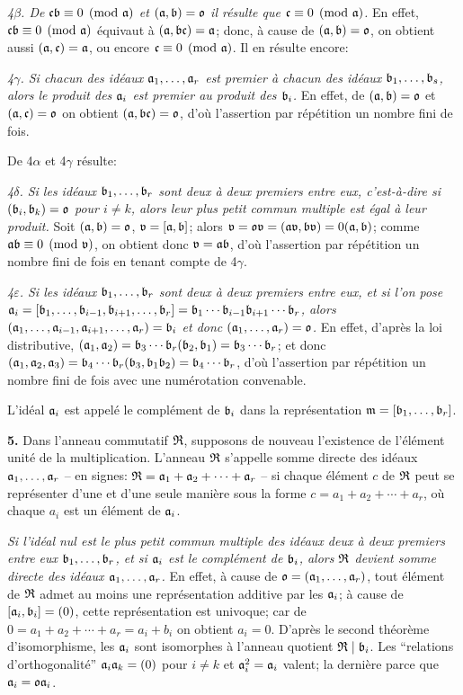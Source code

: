\emph{4$\beta$. De $\mathfrak{c}\mathfrak{b}\equiv0\pmod{\mathfrak{a}}$ et $(\mathfrak{a},\mathfrak{b})=\mathfrak{o}$ il résulte que $\mathfrak{c}\equiv0\pmod{\mathfrak{a}}$.} En effet, $\mathfrak{c}\mathfrak{b}\equiv0\pmod{\mathfrak{a}}$ équivaut à $(\mathfrak{a},\mathfrak{b}\mathfrak{c})=\mathfrak{a}$; donc, à cause de $(\mathfrak{a},\mathfrak{b})=\mathfrak{o}$, on obtient aussi $(\mathfrak{a},\mathfrak{c})=\mathfrak{a}$, ou encore $\mathfrak{c}\equiv0\pmod{\mathfrak{a}}$. Il en résulte encore:

\emph{4$\gamma$. Si chacun des idéaux $\mathfrak{a}_1,\ldots,\mathfrak{a}_r$ est premier à chacun des idéaux $\mathfrak{b}_1,\ldots,\mathfrak{b}_s$, alors le produit des $\mathfrak{a}_i$ est premier au produit des $\mathfrak{b}_i$.} En effet, de $(\mathfrak{a},\mathfrak{b})=\mathfrak{o}$ et $(\mathfrak{a},\mathfrak{c})=\mathfrak{o}$ on obtient $(\mathfrak{a},\mathfrak{b}\mathfrak{c})=\mathfrak{o}$, d'où l'assertion par répétition un nombre fini de fois.

De 4$\alpha$ et 4$\gamma$ résulte:

\emph{4$\delta$. Si les idéaux $\mathfrak{b}_1,\ldots,\mathfrak{b}_r$ sont deux à deux premiers entre eux, c'est-à-dire si $(\mathfrak{b}_i,\mathfrak{b}_k)=\mathfrak{o}$ pour $i\ne k$, alors leur plus petit commun multiple est égal à leur produit.} Soit $(\mathfrak{a},\mathfrak{b})=\mathfrak{o}$, $\mathfrak{v}=[\mathfrak{a},\mathfrak{b}]$; alors $\mathfrak{v}=\mathfrak{o}\mathfrak{v}=(\mathfrak{a}\mathfrak{v},\mathfrak{b}\mathfrak{v})=0(\mathfrak{a},\mathfrak{b})$; comme $\mathfrak{a}\mathfrak{b}\equiv0\pmod{\mathfrak{v}}$, on obtient donc $\mathfrak{v}=\mathfrak{a}\mathfrak{b}$, d'où l'assertion par répétition un nombre fini de fois en tenant compte de 4$\gamma$.

\emph{4$\varepsilon$. Si les idéaux $\mathfrak{b}_1,\ldots,\mathfrak{b}_r$ sont deux à deux premiers entre eux, et si l'on pose $\mathfrak{a}_i=[\mathfrak{b}_1,\ldots,\mathfrak{b}_{i-1},\mathfrak{b}_{i+1},\ldots,\mathfrak{b}_r]=\mathfrak{b}_1\cdots\mathfrak{b}_{i-1}\mathfrak{b}_{i+1}\cdots\mathfrak{b}_r$, alors $(\mathfrak{a}_1,\ldots,\mathfrak{a}_{i-1},\mathfrak{a}_{i+1},\ldots,\mathfrak{a}_r)=\mathfrak{b}_i$ et donc $(\mathfrak{a}_1,\ldots,\mathfrak{a}_r)=\mathfrak{o}$.} En effet, d'après la loi distributive, $(\mathfrak{a}_1,\mathfrak{a}_2)=\mathfrak{b}_3\cdots\mathfrak{b}_r(\mathfrak{b}_2,\mathfrak{b}_1)=\mathfrak{b}_3\cdots\mathfrak{b}_r$; et donc $(\mathfrak{a}_1,\mathfrak{a}_2,\mathfrak{a}_3)=\mathfrak{b}_4\cdots\mathfrak{b}_r(\mathfrak{b}_3,\mathfrak{b}_1\mathfrak{b}_2)=\mathfrak{b}_4\cdots\mathfrak{b}_r$, d'où l'assertion par répétition un nombre fini de fois avec une numérotation convenable.

L'idéal $\mathfrak{a}_i$ est appelé le complément de $\mathfrak{b}_i$ dans la représentation $\mathfrak{m}=[\mathfrak{b}_1,\ldots,\mathfrak{b}_r]$.

\textbf{5.} Dans l'anneau commutatif $\mathfrak{R}$, supposons de nouveau l'existence de l'élément unité de la multiplication. L'anneau $\mathfrak{R}$ s'appelle somme directe des idéaux $\mathfrak{a}_1,\ldots,\mathfrak{a}_r$ -- en signes: $\mathfrak{R}=\mathfrak{a}_1+\mathfrak{a}_2+\cdots+\mathfrak{a}_r$ -- si chaque élément $c$ de $\mathfrak{R}$ peut se représenter d'une et d'une seule manière sous la forme $c=a_1+a_2+\cdots+a_r$, où chaque $a_i$ est un élément de $\mathfrak{a}_i$.

\emph{Si l'idéal nul est le plus petit commun multiple des idéaux deux à deux premiers entre eux $\mathfrak{b}_1,\ldots,\mathfrak{b}_r$, et si $\mathfrak{a}_i$ est le complément de $\mathfrak{b}_i$, alors $\mathfrak{R}$ devient somme directe des idéaux $\mathfrak{a}_1,\ldots,\mathfrak{a}_r$.} En effet, à cause de $\mathfrak{o}=(\mathfrak{a}_1,\ldots,\mathfrak{a}_r)$, tout élément de $\mathfrak{R}$ admet au moins une représentation additive par les $\mathfrak{a}_i$; à cause de $[\mathfrak{a}_i,\mathfrak{b}_i]=(0)$, cette représentation est univoque; car de $0=a_1+a_2+\cdots+a_r=a_i+b_i$ on obtient $a_i=0$. D'après le second théorème d'isomorphisme, les $\mathfrak{a}_i$ sont isomorphes à l'anneau quotient $\mathfrak{R}\mid\mathfrak{b}_i$. Les ``relations d'orthogonalité'' $\mathfrak{a}_i\mathfrak{a}_k=(0)$ pour $i\ne k$ et $\mathfrak{a}_i^2=\mathfrak{a}_i$ valent; la dernière parce que $\mathfrak{a}_i=\mathfrak{o}\mathfrak{a}_i$.

